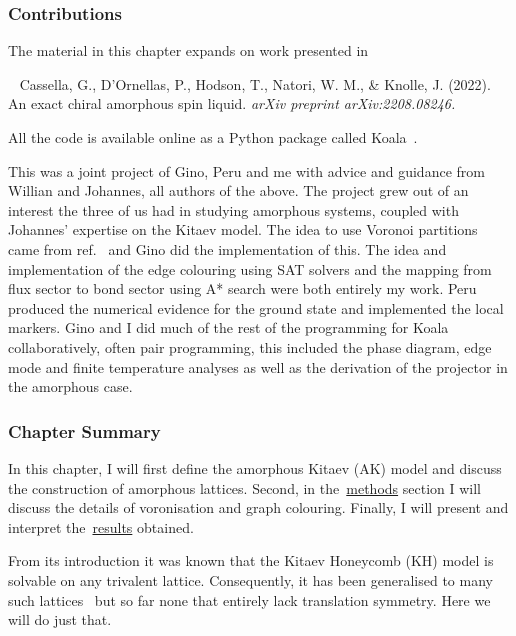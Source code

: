 \hypertarget{ak-contributions}{%
\subsubsection{Contributions}\label{ak-contributions}}

The material in this chapter expands on work presented in

~\autocite{cassellaExactChiralAmorphous2022} Cassella, G., D'Ornellas, P., Hodson, T., Natori, W. M., \& Knolle, J. (2022). An exact chiral amorphous spin liquid. \emph{arXiv preprint arXiv:2208.08246.}

All the code is available online as a Python package called Koala~\autocite{hodsonKoalaKitaevAmorphous2022}.

This was a joint project of Gino, Peru and me with advice and guidance from Willian and Johannes, all authors of the above. The project grew out of an interest the three of us had in studying amorphous systems, coupled with Johannes' expertise on the Kitaev model. The idea to use Voronoi partitions came from ref.~\autocite{marsalTopologicalWeaireThorpe2020} and Gino did the implementation of this. The idea and implementation of the edge colouring using SAT solvers and the mapping from flux sector to bond sector using A* search were both entirely my work. Peru produced the numerical evidence for the ground state and implemented the local markers. Gino and I did much of the rest of the programming for Koala collaboratively, often pair programming, this included the phase diagram, edge mode and finite temperature analyses as well as the derivation of the projector in the amorphous case.

\hypertarget{ak-summary}{%
\subsubsection{Chapter Summary}\label{ak-summary}}

In this chapter, I will first define the amorphous Kitaev (AK) model and discuss the construction of amorphous lattices. Second, in the~\protect\hyperlink{amk-methods}{methods} section I will discuss the details of voronisation and graph colouring. Finally, I will present and interpret the~\protect\hyperlink{amk-results}{results} obtained.

From its introduction it was known that the Kitaev Honeycomb (KH) model is solvable on any trivalent lattice. Consequently, it has been generalised to many such lattices~\autocite{eschmannThermodynamicClassificationThreedimensional2020,Yao2009,eschmann2019thermodynamics,Peri2020} but so far none that entirely lack translation symmetry. Here we will do just that.

